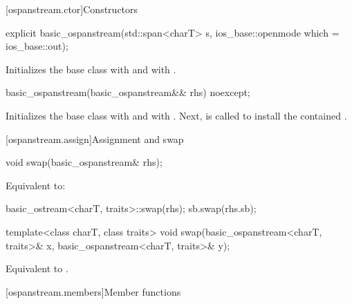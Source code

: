 [ospanstream.ctor]{Constructors}

%
\begin{itemdecl}
explicit basic_ospanstream(std::span<charT> s,
                           ios_base::openmode which = ios_base::out);
\end{itemdecl}

\begin{itemdescr}
\pnum
\effects
Initializes the base class with
and  with
.
\end{itemdescr}

%
\begin{itemdecl}
basic_ospanstream(basic_ospanstream&& rhs) noexcept;
\end{itemdecl}

\begin{itemdescr}
\pnum
\effects
Initializes the base class with 
and  with .
Next, 
is called to install the contained .
\end{itemdescr}

[ospanstream.assign]{Assignment and swap}

%
\begin{itemdecl}
void swap(basic_ospanstream& rhs);
\end{itemdecl}

\begin{itemdescr}
\pnum
\effects
Equivalent to:
\begin{codeblock}
basic_ostream<charT, traits>::swap(rhs);
sb.swap(rhs.sb);
\end{codeblock}
\end{itemdescr}

%
\begin{itemdecl}
template<class charT, class traits>
  void swap(basic_ospanstream<charT, traits>& x, basic_ospanstream<charT, traits>& y);
\end{itemdecl}

\begin{itemdescr}
\pnum
\effects
Equivalent to .
\end{itemdescr}

[ospanstream.members]{Member functions}

